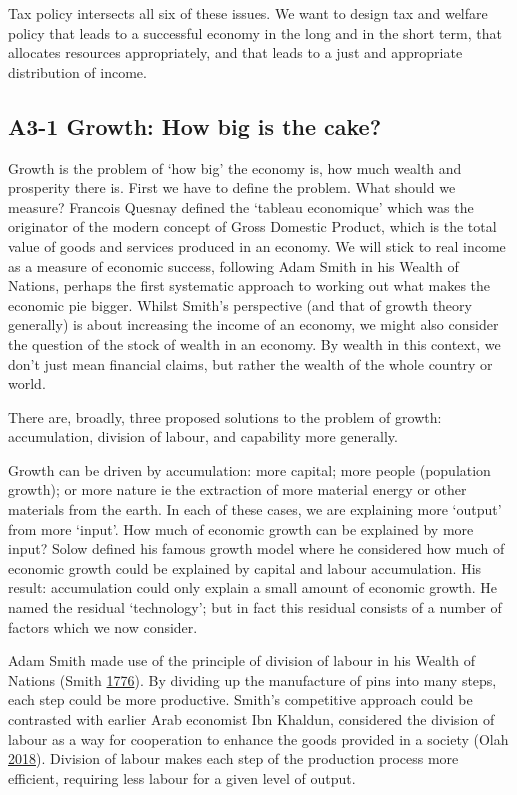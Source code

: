 \documentclass[]{tufte-handout}
\begin{document}
Tax policy intersects all six of these issues. We want to design tax and
welfare policy that leads to a successful economy in the long and in the
short term, that allocates resources appropriately, and that leads to a
just and appropriate distribution of income.

\hypertarget{a3-1-growth-how-big-is-the-cake}{%
\subsection{A3-1 Growth: How big is the
cake?}\label{a3-1-growth-how-big-is-the-cake}}

Growth is the problem of `how big' the economy is, how much wealth and
prosperity there is. First we have to define the problem. What should we
measure? Francois Quesnay defined the `tableau economique' which was the
originator of the modern concept of Gross Domestic Product, which is the
total value of goods and services produced in an economy. We will stick
to real income as a measure of economic success, following Adam Smith in
his Wealth of Nations, perhaps the first systematic approach to working
out what makes the economic pie bigger. Whilst Smith's perspective (and
that of growth theory generally) is about increasing the income of an
economy, we might also consider the question of the stock of wealth in
an economy. By wealth in this context, we don't just mean financial
claims, but rather the wealth of the whole country or world.

There are, broadly, three proposed solutions to the problem of growth:
accumulation, division of labour, and capability more generally.

Growth can be driven by accumulation: more capital; more people
(population growth); or more nature ie the extraction of more material
energy or other materials from the earth. In each of these cases, we are
explaining more `output' from more `input'. How much of economic growth
can be explained by more input? Solow defined his famous growth model
where he considered how much of economic growth could be explained by
capital and labour accumulation. His result: accumulation could only
explain a small amount of economic growth. He named the residual
`technology'; but in fact this residual consists of a number of factors
which we now consider.

Adam Smith made use of the principle of division of labour in his Wealth
of Nations (Smith \protect\hyperlink{ref-smith1776wealth}{1776}). By
dividing up the manufacture of pins into many steps, each step could be
more productive. Smith's competitive approach could be contrasted with
earlier Arab economist Ibn Khaldun, considered the division of labour as
a way for cooperation to enhance the goods provided in a society (Olah
\protect\hyperlink{ref-Olah2018}{2018}). Division of labour makes each
step of the production process more efficient, requiring less labour for
a given level of output.
\end{document}
